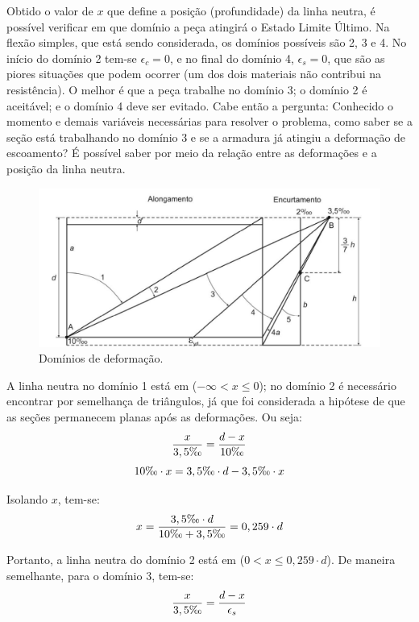 Obtido o valor de $x$ que define a posição (profundidade) da linha neutra, é possível verificar em que domínio a peça atingirá o Estado Limite Último. Na flexão simples, que está sendo considerada, os domínios possíveis são 2, 3 e 4. No início do domínio 2 tem-se $\epsilon_c=0$, e no final do domínio 4, $\epsilon_s=0$, que são as piores situações que podem ocorrer (um dos dois materiais não contribui na resistência). O melhor é que a peça trabalhe no domínio 3; o domínio 2 é aceitável; e o domínio 4 deve ser evitado. Cabe então a pergunta: Conhecido o momento e demais variáveis necessárias para resolver o problema, como saber se a seção está trabalhando no domínio 3 e se a armadura já atingiu a deformação de escoamento? É possível saber por meio da relação entre as deformações e a posição da linha neutra.

\begin{figure}[H]
	\begin{center}
	\caption{Domínios de deformação.}
    	\includegraphics[width=\textwidth]{Linha-neutra/Imagens/Dominios-de-deformacao.jpg}
	\end{center}
\end{figure}

A linha neutra no domínio 1 está em ($-\infty<x\leqslant0$); no domínio 2 é necessário encontrar por semelhança de triângulos, já que foi considerada a hipótese de que as seções permanecem planas após as deformações. Ou seja:
$$\frac{x}{3,5\text{\textperthousand}}=\frac{d-x}{10\text{\textperthousand}}$$
$$10\text{\textperthousand}\cdot x=3,5\text{\textperthousand}\cdot d-3,5\text{\textperthousand}\cdot x$$

Isolando $x$, tem-se:
$$x=\frac{3,5\text{\textperthousand}\cdot d}{10\text{\textperthousand}+3,5\text{\textperthousand}}=0,259\cdot d$$

Portanto, a linha neutra do domínio 2 está em ($0<x\leqslant0,259\cdot d$). De maneira semelhante, para o domínio 3, tem-se:
\begin{equation}
	\label{equacao-dominio-3}
	\frac{x}{3,5\text{\textperthousand}}=\frac{d-x}{\epsilon_s}
\end{equation}

